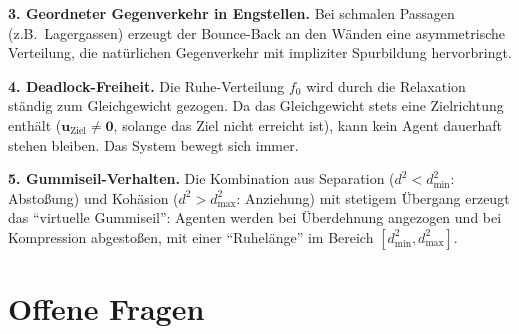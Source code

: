 \documentclass[11pt,a4paper]{article}
\begin{document}
\textbf{3. Geordneter Gegenverkehr in Engstellen.}
Bei schmalen Passagen (z.B.\ Lagergassen) erzeugt der Bounce-Back
an den W\"anden eine asymmetrische Verteilung,
die nat\"urlichen Gegenverkehr mit impliziter Spurbildung hervorbringt.

\textbf{4. Deadlock-Freiheit.}
Die Ruhe-Verteilung $f_0$ wird durch die Relaxation
st\"andig zum Gleichgewicht gezogen.
Da das Gleichgewicht stets eine Zielrichtung enth\"alt ($\mathbf{u}_{\mathrm{Ziel}} \neq \mathbf{0}$,
solange das Ziel nicht erreicht ist),
kann kein Agent dauerhaft stehen bleiben. Das System bewegt sich immer.

\textbf{5. Gummiseil-Verhalten.}
Die Kombination aus Separation ($d^2 < d^2_{\min}$: Absto\ss ung)
und Koh\"asion ($d^2 > d^2_{\max}$: Anziehung)
mit stetigem \"Ubergang erzeugt das ``virtuelle Gummiseil'':
Agenten werden bei \"Uberdehnung angezogen und bei Kompression abgesto\ss en,
mit einer ``Ruhelänge'' im Bereich $[d^2_{\min}, d^2_{\max}]$.

\section{Offene Fragen}
\end{document}
